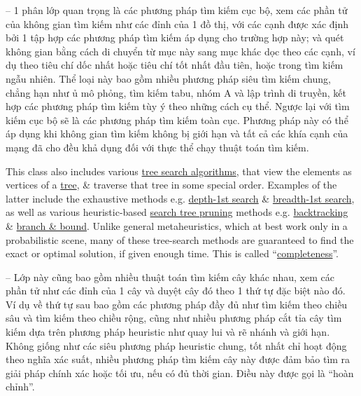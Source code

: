 \documentclass[oneside]{book}
\begin{document}
\begin{enumerate}
	-- 1 phân lớp quan trọng là các phương pháp tìm kiếm cục bộ, xem các phần tử của không gian tìm kiếm như các đỉnh của 1 đồ thị, với các cạnh được xác định bởi 1 tập hợp các phương pháp tìm kiếm áp dụng cho trường hợp này; và quét không gian bằng cách di chuyển từ mục này sang mục khác dọc theo các cạnh, ví dụ theo tiêu chí dốc nhất hoặc tiêu chí tốt nhất đầu tiên, hoặc trong tìm kiếm ngẫu nhiên. Thể loại này bao gồm nhiều phương pháp siêu tìm kiếm chung, chẳng hạn như ủ mô phỏng, tìm kiếm tabu, nhóm A và lập trình di truyền, kết hợp các phương pháp tìm kiếm tùy ý theo những cách cụ thể. Ngược lại với tìm kiếm cục bộ sẽ là các phương pháp tìm kiếm toàn cục. Phương pháp này có thể áp dụng khi không gian tìm kiếm không bị giới hạn và tất cả các khía cạnh của mạng đã cho đều khả dụng đối với thực thể chạy thuật toán tìm kiếm.
	
	This class also includes various \href{https://en.wikipedia.org/wiki/Tree_traversal}{tree search algorithms}, that view the elements as vertices of a \href{https://en.wikipedia.org/wiki/Tree_(graph_theory)}{tree}, \& traverse that tree in some special order. Examples of the latter include the exhaustive methods e.g. \href{https://en.wikipedia.org/wiki/Depth-first_search}{depth-1st search} \& \href{https://en.wikipedia.org/wiki/Breadth-first_search}{breadth-1st search}, as well as various heuristic-based \href{https://en.wikipedia.org/wiki/Pruning_(decision_trees)}{search tree pruning} methods e.g. \href{https://en.wikipedia.org/wiki/Backtracking}{backtracking} \& \href{https://en.wikipedia.org/wiki/Branch\_and\_bound}{branch \& bound}. Unlike general metaheuristics, which at best work only in a probabilistic scene, many of these tree-search methods are guaranteed to find the exact or optimal solution, if given enough time. This is called ``\href{https://en.wikipedia.org/wiki/Completeness_(logic)}{completeness}''.
	
	-- Lớp này cũng bao gồm nhiều thuật toán tìm kiếm cây khác nhau, xem các phần tử như các đỉnh của 1 cây và duyệt cây đó theo 1 thứ tự đặc biệt nào đó. Ví dụ về thứ tự sau bao gồm các phương pháp đầy đủ như tìm kiếm theo chiều sâu và tìm kiếm theo chiều rộng, cũng như nhiều phương pháp cắt tỉa cây tìm kiếm dựa trên phương pháp heuristic như quay lui và rẽ nhánh và giới hạn. Không giống như các siêu phương pháp heuristic chung, tốt nhất chỉ hoạt động theo nghĩa xác suất, nhiều phương pháp tìm kiếm cây này được đảm bảo tìm ra giải pháp chính xác hoặc tối ưu, nếu có đủ thời gian. Điều này được gọi là ``hoàn chỉnh''.
	

\end{enumerate}
\end{document}
